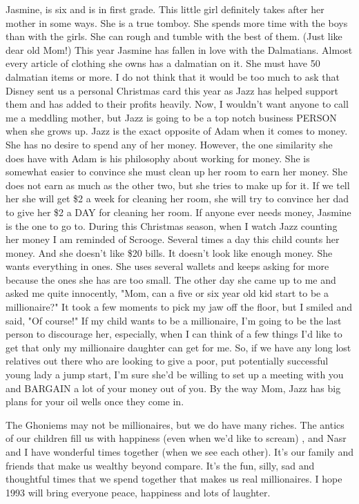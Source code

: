 Jasmine, is six and is in first grade. This little girl definitely takes after her mother in some ways. She is a true tomboy. She spends more
time with the boys than with the girls. She can rough and tumble with the best of them. (Just like dear old Mom!) This year Jasmine has fallen
in love with the Dalmatians. Almost every article of clothing she owns has a dalmatian on it. She must have 50 dalmatian items or more. I do not
think that it would be too much to ask that Disney sent us a personal Christmas card this year as Jazz has helped support them and has added to
their profits heavily. Now, I wouldn't want anyone to call me a meddling mother, but Jazz is going to be a top notch business PERSON when she
grows up. Jazz is the exact opposite of Adam when it comes to money. She has no desire to spend any of her money. However, the one similarity
she does have with Adam is his philosophy about working for money. She is somewhat easier to convince she must clean up her room to earn her
money. She does not earn as much as the other two, but she tries to make up for it. If we tell her she will get \$2 a week for cleaning her
room, she will try to convince her dad to give her \$2 a DAY for cleaning her room. If anyone ever needs money, Jasmine is the one to go to.
During this Christmas season, when I watch Jazz counting her money I am reminded of Scrooge. Several times a day this child counts her money.
And she doesn't like \$20 bills. It doesn't look like enough money. She wants everything in ones. She uses several wallets and keeps asking for
more because the ones she has are too small. The other day she came up to me and asked me quite innocently, "Mom, can a five or six year old kid
start to be a millionaire?" It took a few moments to pick my jaw off the floor, but I smiled and said, "Of course!" If my child wants to be a
millionaire, I'm going to be the last person to discourage her, especially, when I can think of a few things I'd like to get that only my
millionaire daughter can get for me. So, if we have any long lost relatives out there who are looking to give a poor, put potentially successful
young lady a jump start, I'm sure she'd be willing to set up a meeting with you and BARGAIN a lot of your money out of you. By the way Mom, Jazz
has big plans for your oil wells once they come in.

The Ghoniems may not be millionaires, but we do have many riches. The antics of our children fill us with happiness (even when we'd like to
scream) , and Nasr and I have wonderful times together (when we see each other). It's our family and friends that make us wealthy beyond
compare. It's the fun, silly, sad and thoughtful times that we spend together that makes us real millionaires. I hope 1993 will bring everyone
peace, happiness and lots of laughter.

%
